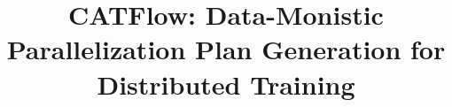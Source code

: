 \usepackage{tikz}
\usepackage{amsmath}
\usepackage{cleveref}

\newcommand{\name}{CATFlow}



\date{}

\title{\Large \bf \name{}: Data-Monistic Parallelization Plan Generation for Distributed Training}

\author{
} %

\maketitle

